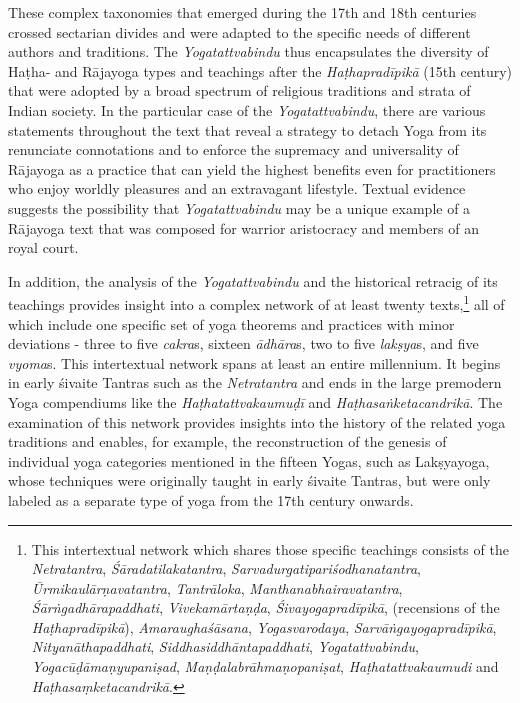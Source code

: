 These complex taxonomies that emerged during the 17th and 18th centuries crossed sectarian divides and were adapted to the specific needs of different authors and traditions. The \textit{Yogatattvabindu} thus encapsulates the diversity of Haṭha- and Rājayoga types and teachings after the \textit{Haṭhapradīpikā} (15th century) that were adopted by a broad spectrum of religious traditions and strata of Indian society. In the particular case of the \textit{Yogatattvabindu}, there are various statements throughout the text that reveal a strategy to detach Yoga from its renunciate connotations and to enforce the supremacy and universality of Rājayoga as a practice that can yield the highest benefits even for practitioners who enjoy worldly pleasures and an extravagant lifestyle. Textual evidence suggests the possibility that \textit{Yogatattvabindu} may be a unique example of a Rājayoga text that was composed for warrior aristocracy and members of an royal court. 

In addition, the analysis of the \textit{Yogatattvabindu} and the historical retracig of its teachings provides insight into a complex network of at least twenty texts,\footnote{This intertextual network which shares those specific teachings consists of the \textit{Netratantra}, \textit{Śāradatilakatantra}, \textit{Sarvadurgatipariśodhanatantra}, \textit{Ūrmikaulārṇavatantra}, \textit{Tantrāloka}, \textit{Manthanabhairavatantra}, \textit{Śārṅgadhārapaddhati}, \textit{Vivekamārtaṇḍa}, \textit{Śivayogapradīpikā}, (recensions of the \textit{Haṭhapradīpikā}), \textit{Amaraughaśāsana}, \textit{Yogasvarodaya}, \textit{Sarvāṅgayogapradīpikā}, \textit{Nityanāthapaddhati}, \textit{Siddhasiddhāntapaddhati}, \textit{Yogatattvabindu}, \textit{Yogacūḍāmaṇyupaniṣad}, \textit{Maṇḍalabrāhmaṇopaniṣat}, \textit{Haṭhatattvakaumudi} and \textit{Haṭhasaṃketacandrikā}.} all of which include one specific set of yoga theorems and practices with minor deviations - three to five \textit{cakra}s, sixteen \textit{ādhāra}s, two to five \textit{lakṣya}s, and five \textit{vyoma}s. This intertextual network spans at least an entire millennium. It begins in early śivaite Tantras such as the \textit{Netratantra} and ends in the large premodern Yoga compendiums like the \textit{Haṭhatattvakaumuḍī} and \textit{Haṭhasaṅketacandrikā}. The examination of this network provides insights into the history of the related yoga traditions and enables, for example, the reconstruction of the genesis of individual yoga categories mentioned in the fifteen Yogas, such as Lakṣyayoga, whose techniques were originally taught in early śivaite Tantras, but were only labeled as a separate type of yoga from the 17th century onwards.

